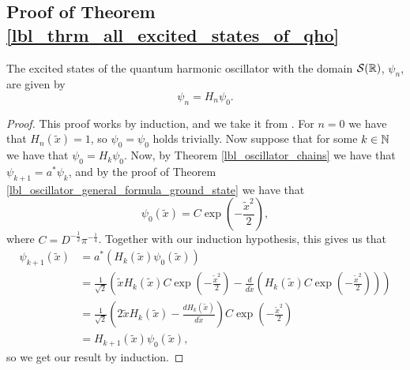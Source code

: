 \subsection{Proof of Theorem \eqref{lbl_thrm_all_excited_states_of_qho}}\label{proof_lbl_thrm_all_excited_states_of_qho}


\begin{theorem}
  The excited states of the quantum harmonic oscillator with the domain $\mathcal{S}(\mathbb{R})$, $\psi_n$, are given by
  \begin{equation*}
    \psi_n = H_n \psi_0.
  \end{equation*}
\end{theorem}
\begin{proof}
  This proof works by induction, and we take it from {\cite[Theorem 11.3]{Hall2013}}. For $n=0$ we have that $H_n(\tilde{x}) = 1$, so $\psi_0 = \psi_0$ holds trivially. Now suppose that for some $k \in \mathbb{N}$ we have that $\psi_0 = H_k \psi_0$. Now, by Theorem \eqref{lbl_oscillator_chains} we have that $\psi_{k+1} = a^* \psi_k$, and by the proof of Theorem \eqref{lbl_oscillator_general_formula_ground_state} we have that
  \begin{equation*}
    \psi_0 (\tilde{x})
    =
    C\exp\left(-\frac{\tilde{x}^2}{2}\right),
  \end{equation*}
  where $C = D^{-\frac{1}{2}}\pi^{-\frac{1}{4}}$. Together with our induction hypothesis, this gives us that
  \begin{align*}
    \psi_{k+1}(\tilde{x})
    &=
    a^*(H_k(\tilde{x})\psi_0(\tilde{x})) \\
    &=
    \frac{1}{\sqrt{2}}
      \left(
        \tilde{x}H_k(\tilde{x})C\exp\left(-\frac{\tilde{x}^2}{2}\right)
        -
        \frac{d}{d\tilde{x}}\left( H_k(\tilde{x})C\exp\left(-\frac{\tilde{x}^2}{2}\right) \right)
      \right) \\
    &=
    \frac{1}{\sqrt{2}}
      \left(
        2\tilde{x}H_k(\tilde{x}) - \frac{d H_k(\tilde{x})}{d \tilde{x}}
      \right) C\exp\left(-\frac{\tilde{x}^2}{2}\right) \\
    &=
    H_{k+1}(\tilde{x})\psi_0(\tilde{x}),
  \end{align*}
  so we get our result by induction.
\end{proof}
